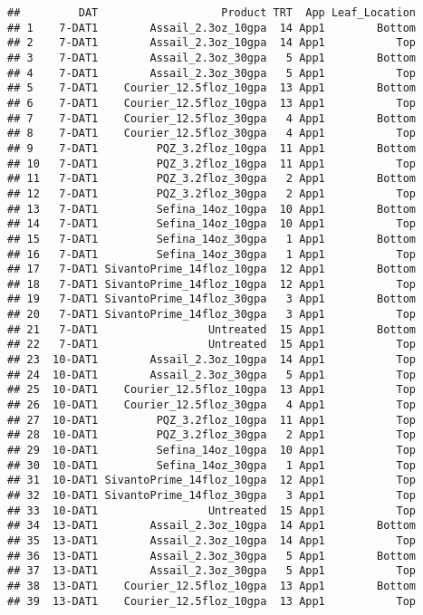 \documentclass[
]{article}
\begin{document}
\begin{verbatim}
##         DAT                   Product TRT  App Leaf_Location
## 1    7-DAT1        Assail_2.3oz_10gpa  14 App1        Bottom
## 2    7-DAT1        Assail_2.3oz_10gpa  14 App1           Top
## 3    7-DAT1        Assail_2.3oz_30gpa   5 App1        Bottom
## 4    7-DAT1        Assail_2.3oz_30gpa   5 App1           Top
## 5    7-DAT1    Courier_12.5floz_10gpa  13 App1        Bottom
## 6    7-DAT1    Courier_12.5floz_10gpa  13 App1           Top
## 7    7-DAT1    Courier_12.5floz_30gpa   4 App1        Bottom
## 8    7-DAT1    Courier_12.5floz_30gpa   4 App1           Top
## 9    7-DAT1         PQZ_3.2floz_10gpa  11 App1        Bottom
## 10   7-DAT1         PQZ_3.2floz_10gpa  11 App1           Top
## 11   7-DAT1         PQZ_3.2floz_30gpa   2 App1        Bottom
## 12   7-DAT1         PQZ_3.2floz_30gpa   2 App1           Top
## 13   7-DAT1         Sefina_14oz_10gpa  10 App1        Bottom
## 14   7-DAT1         Sefina_14oz_10gpa  10 App1           Top
## 15   7-DAT1         Sefina_14oz_30gpa   1 App1        Bottom
## 16   7-DAT1         Sefina_14oz_30gpa   1 App1           Top
## 17   7-DAT1 SivantoPrime_14floz_10gpa  12 App1        Bottom
## 18   7-DAT1 SivantoPrime_14floz_10gpa  12 App1           Top
## 19   7-DAT1 SivantoPrime_14floz_30gpa   3 App1        Bottom
## 20   7-DAT1 SivantoPrime_14floz_30gpa   3 App1           Top
## 21   7-DAT1                 Untreated  15 App1        Bottom
## 22   7-DAT1                 Untreated  15 App1           Top
## 23  10-DAT1        Assail_2.3oz_10gpa  14 App1           Top
## 24  10-DAT1        Assail_2.3oz_30gpa   5 App1           Top
## 25  10-DAT1    Courier_12.5floz_10gpa  13 App1           Top
## 26  10-DAT1    Courier_12.5floz_30gpa   4 App1           Top
## 27  10-DAT1         PQZ_3.2floz_10gpa  11 App1           Top
## 28  10-DAT1         PQZ_3.2floz_30gpa   2 App1           Top
## 29  10-DAT1         Sefina_14oz_10gpa  10 App1           Top
## 30  10-DAT1         Sefina_14oz_30gpa   1 App1           Top
## 31  10-DAT1 SivantoPrime_14floz_10gpa  12 App1           Top
## 32  10-DAT1 SivantoPrime_14floz_30gpa   3 App1           Top
## 33  10-DAT1                 Untreated  15 App1           Top
## 34  13-DAT1        Assail_2.3oz_10gpa  14 App1        Bottom
## 35  13-DAT1        Assail_2.3oz_10gpa  14 App1           Top
## 36  13-DAT1        Assail_2.3oz_30gpa   5 App1        Bottom
## 37  13-DAT1        Assail_2.3oz_30gpa   5 App1           Top
## 38  13-DAT1    Courier_12.5floz_10gpa  13 App1        Bottom
## 39  13-DAT1    Courier_12.5floz_10gpa  13 App1           Top

\end{verbatim}
\end{document}
